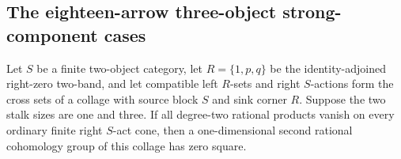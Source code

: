 \subsection{The eighteen-arrow three-object strong-component cases}

\begin{lemma}
\label{C:right-zero-singleton-three-stalks}
Let $S$ be a finite two-object category, let
$R=\{1,p,q\}$ be the identity-adjoined right-zero two-band,
and let compatible left $R$-sets and right $S$-actions form
the cross sets of a collage with source block $S$ and sink
corner $R$. Suppose the two stalk sizes are one and three.
If all degree-two rational products vanish on every ordinary
finite right $S$-act cone, then a one-dimensional second
rational cohomology group of this collage has zero square.
\end{lemma}
